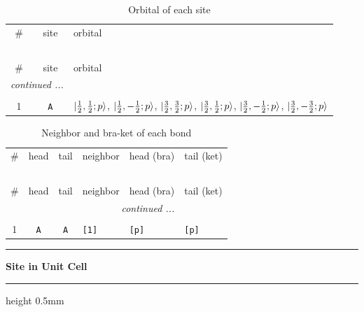 \documentclass[fleqn,10pt,landscape]{jsarticle}
\begin{document}
\renewcommand{\arraystretch}{1.6}
\begin{longtable}[l]{ccl}
\captionsetup{justification=raggedright, singlelinecheck=off}
\caption{Orbital of each site}
 \\
 \hline \hline
\# & site & orbital \\ \hline \endfirsthead

\multicolumn{2}{l}{\tablename\ \thetable{}} \\
 \hline \hline
\# & site & orbital \\ \hline \endhead

 \hline \hline
\multicolumn{2}{r}{\footnotesize\it continued ...} \\ \endfoot

 \hline \hline
\multicolumn{2}{r}{} \\ \endlastfoot

1 & \texttt{A} & $\ket{\frac{1}{2},\frac{1}{2};p}$, $\ket{\frac{1}{2},- \frac{1}{2};p}$, $\ket{\frac{3}{2},\frac{3}{2};p}$, $\ket{\frac{3}{2},\frac{1}{2};p}$, $\ket{\frac{3}{2},- \frac{1}{2};p}$, $\ket{\frac{3}{2},- \frac{3}{2};p}$ \\
\end{longtable}
\renewcommand{\arraystretch}{1.6}
\begin{longtable}[l]{ccclll}
\captionsetup{justification=raggedright, singlelinecheck=off}
\caption{Neighbor and bra-ket of each bond}
 \\
 \hline \hline
\# & head & tail & neighbor & head (bra) & tail (ket) \\ \hline \endfirsthead

\multicolumn{5}{l}{\tablename\ \thetable{}} \\
 \hline \hline
\# & head & tail & neighbor & head (bra) & tail (ket) \\ \hline \endhead

 \hline \hline
\multicolumn{5}{r}{\footnotesize\it continued ...} \\ \endfoot

 \hline \hline
\multicolumn{5}{r}{} \\ \endlastfoot

1 & \texttt{A} & \texttt{A} & \texttt{[1]} & \texttt{[p]} & \texttt{[p]} \\
\end{longtable}
\vspace{5mm}
\noindent \rule[0.5mm]{5mm}{0.5mm}\hspace{3mm}\textbf{Site in Unit Cell}\hspace{3mm}\leaders\hrule height 0.5mm\hfill\kern0pt
\vspace{3mm}
\end{document}
